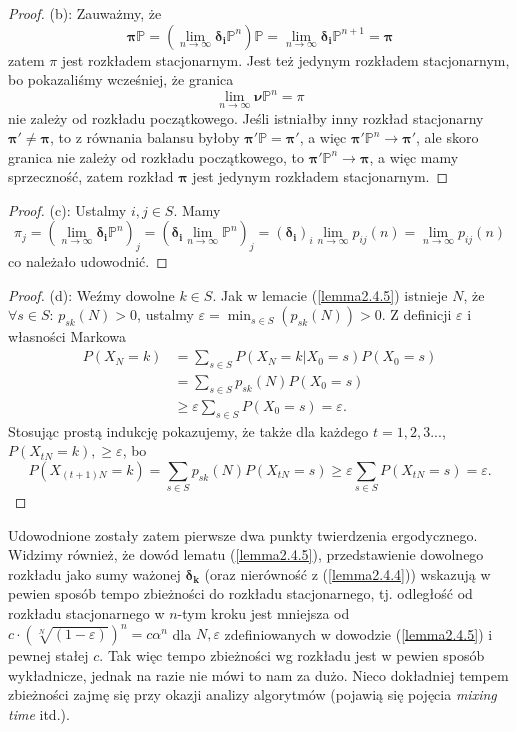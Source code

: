 \documentclass[a4paper]{article}
\theoremstyle{defn}
\theoremstyle{theorem}
\theoremstyle{lemma}
\theoremstyle{cor}
\theoremstyle{fact}
\begin{document}
\begin{proof}
(b): Zauważmy, że $$\boldsymbol{\pi}\mathbb{P} = (\lim\limits_{n \to \infty} \boldsymbol{\delta_i}\mathbb{P}^n)\mathbb{P} = \lim\limits_{n \to \infty} \boldsymbol{\delta_i}\mathbb{P}^{n+1} = \boldsymbol{\pi}$$ zatem $\pi$ jest rozkładem stacjonarnym.
Jest też jedynym rozkładem stacjonarnym, bo pokazaliśmy wcześniej, że granica $$\lim\limits_{n \to \infty} \boldsymbol{\nu}\mathbb{P}^n = \pi$$ nie zależy od rozkładu początkowego. Jeśli istniałby inny rozkład stacjonarny $\boldsymbol{\pi'} \neq \boldsymbol{\pi}$, to z równania balansu byłoby $\boldsymbol{\pi'}\mathbb{P} = \boldsymbol{\pi'}$, a więc $\boldsymbol{\pi'}\mathbb{P}^n \to \boldsymbol{\pi'}$, ale skoro granica nie zależy od rozkładu początkowego, to $\boldsymbol{\pi'}\mathbb{P}^n \to \boldsymbol{\pi}$, a więc mamy sprzeczność, zatem rozkład $\boldsymbol{\pi}$ jest jedynym rozkładem stacjonarnym.
\end{proof}
\begin{proof}
(c): Ustalmy $i,j \in S$. Mamy $$\pi_j = (\lim\limits_{n \to \infty} \boldsymbol{\delta_i}\mathbb{P}^n)_j = (\boldsymbol{\delta_i} \lim\limits_{n \to \infty} \mathbb{P}^n)_j = (\boldsymbol{\delta_i})_i \lim\limits_{n \to \infty} p_{ij}(n) = \lim\limits_{n \to \infty} p_{ij}(n)$$ co należało udowodnić.
\end{proof}
\begin{proof}
(d): Weźmy dowolne $k \in S$. Jak w lemacie (\ref{lemma2.4.5}) istnieje $N$, że $\forall s \in S:\, p_{sk}(N) > 0$, ustalmy $\varepsilon = \min_{s \in S}(p_{sk}(N)) > 0$. Z definicji $\varepsilon$ i własności Markowa
\begin{align*}
P(X_N = k) &= \sum\limits_{s \in S} P(X_N = k|X_0 = s)P(X_0 = s) \\
&= \sum\limits_{s \in S} p_{sk}(N)P(X_0 = s) \\
&\geq \varepsilon \sum\limits_{s \in S} P(X_0 = s) = \varepsilon.
\end{align*}
Stosując prostą indukcję pokazujemy, że także dla każdego $t = 1,2,3...$, $P(X_{tN} = k), \geq \varepsilon$, bo
$$P(X_{(t+1)N} = k) = \sum\limits_{s \in S} p_{sk}(N)P(X_{tN} = s) \geq \varepsilon \sum\limits_{s \in S} P(X_{tN} = s) = \varepsilon.$$
\end{proof}
Udowodnione zostały zatem pierwsze dwa punkty twierdzenia ergodycznego. Widzimy również, że dowód lematu (\ref{lemma2.4.5}), przedstawienie dowolnego rozkładu jako sumy ważonej $\boldsymbol{\delta_k}$ (oraz nierówność z (\ref{lemma2.4.4})) wskazują w pewien sposób tempo zbieżności do rozkładu stacjonarnego, tj. odległość od rozkładu stacjonarnego w $n$-tym kroku jest mniejsza od $c \cdot (\sqrt[N]{(1-\varepsilon)})^n = c\alpha^n$ dla $N, \varepsilon$ zdefiniowanych w dowodzie (\ref{lemma2.4.5}) i pewnej stałej $c$. Tak więc tempo zbieżności wg rozkładu jest w pewien sposób wykładnicze, jednak na razie nie mówi to nam za dużo. Nieco dokładniej tempem zbieżności zajmę się przy okazji analizy algorytmów (pojawią się pojęcia \textit{mixing time} itd.).
\\\\
\end{document}

